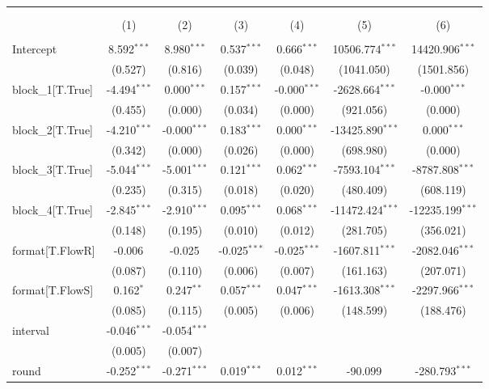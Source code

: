 \begin{table}[!htbp] \centering
\begin{tabular}{@{\extracolsep{5pt}}lcccccc}
\\[-1.8ex]\hline
\hline \\[-1.8ex]
\\[-1.8ex] & (1) & (2) & (3) & (4) & (5) & (6) \\
\hline \\[-1.8ex]
 Intercept & 8.592$^{***}$ & 8.980$^{***}$ & 0.537$^{***}$ & 0.666$^{***}$ & 10506.774$^{***}$ & 14420.906$^{***}$ \\
& (0.527) & (0.816) & (0.039) & (0.048) & (1041.050) & (1501.856) \\
 block_1[T.True] & -4.494$^{***}$ & 0.000$^{***}$ & 0.157$^{***}$ & -0.000$^{***}$ & -2628.664$^{***}$ & -0.000$^{***}$ \\
& (0.455) & (0.000) & (0.034) & (0.000) & (921.056) & (0.000) \\
 block_2[T.True] & -4.210$^{***}$ & -0.000$^{***}$ & 0.183$^{***}$ & 0.000$^{***}$ & -13425.890$^{***}$ & 0.000$^{***}$ \\
& (0.342) & (0.000) & (0.026) & (0.000) & (698.980) & (0.000) \\
 block_3[T.True] & -5.044$^{***}$ & -5.001$^{***}$ & 0.121$^{***}$ & 0.062$^{***}$ & -7593.104$^{***}$ & -8787.808$^{***}$ \\
& (0.235) & (0.315) & (0.018) & (0.020) & (480.409) & (608.119) \\
 block_4[T.True] & -2.845$^{***}$ & -2.910$^{***}$ & 0.095$^{***}$ & 0.068$^{***}$ & -11472.424$^{***}$ & -12235.199$^{***}$ \\
& (0.148) & (0.195) & (0.010) & (0.012) & (281.705) & (356.021) \\
 format[T.FlowR] & -0.006$^{}$ & -0.025$^{}$ & -0.025$^{***}$ & -0.025$^{***}$ & -1607.811$^{***}$ & -2082.046$^{***}$ \\
& (0.087) & (0.110) & (0.006) & (0.007) & (161.163) & (207.071) \\
 format[T.FlowS] & 0.162$^{*}$ & 0.247$^{**}$ & 0.057$^{***}$ & 0.047$^{***}$ & -1613.308$^{***}$ & -2297.966$^{***}$ \\
& (0.085) & (0.115) & (0.005) & (0.006) & (148.599) & (188.476) \\
 interval & -0.046$^{***}$ & -0.054$^{***}$ & & & & \\
& (0.005) & (0.007) & & & & \\
 round & -0.252$^{***}$ & -0.271$^{***}$ & 0.019$^{***}$ & 0.012$^{***}$ & -90.099$^{}$ & -280.793$^{***}$ \\

\end{tabular}
\end{table}
